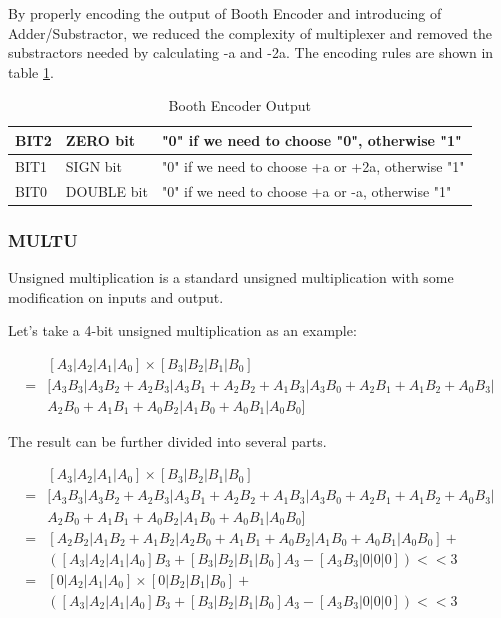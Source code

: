 By properly encoding the output of Booth Encoder and introducing of Adder/Substractor,
we reduced the complexity of multiplexer and removed the substractors needed by calculating -a and -2a.
The encoding rules are shown in table \ref{tab:booth_enc}.

\begin{table}[!ht]
\centering
\caption{Booth Encoder Output}
\label{tab:booth_enc}
\begin{tabular}{|l|l|l|}
\hline
BIT2 & ZERO bit & "0" if we need to choose "0", otherwise "1"\\
\hline
BIT1 & SIGN bit & "0" if we need to choose +a or +2a, otherwise "1"\\
\hline
BIT0 & DOUBLE bit & "0" if we need to choose +a or -a, otherwise "1"\\
\hline
\end{tabular}
\end{table}

\subsubsection[MULTU]{MULTU}
Unsigned multiplication is a standard unsigned multiplication with some modification
on inputs and output.

Let's take a 4-bit unsigned multiplication as an example:

\begin{align*}
&[A_3|A_2|A_1|A_0] \times [B_3|B_2|B_1|B_0]\\
=&[A_3B_3|A_3B_2+A_2B_3|A_3B_1+A_2B_2+A_1B_3|A_3B_0+A_2B_1+A_1B_2+A_0B_3|\\
 &A_2B_0+A_1B_1+A_0B_2|A_1B_0+A_0B_1|A_0B_0]
\end{align*}

The result can be further divided into several parts.

\begin{align*}
&[A_3|A_2|A_1|A_0] \times [B_3|B_2|B_1|B_0]\\
=&[A_3B_3|A_3B_2+A_2B_3|A_3B_1+A_2B_2+A_1B_3|A_3B_0+A_2B_1+A_1B_2+A_0B_3|\\
 &A_2B_0+A_1B_1+A_0B_2|A_1B_0+A_0B_1|A_0B_0]\\
=&[A_2B_2|A_1B_2+A_1B_2|A_2B_0+A_1B_1+A_0B_2|A_1B_0+A_0B_1|A_0B_0]+\\
 &([A_3|A_2|A_1|A_0]B_3+[B_3|B_2|B_1|B_0]A_3-[A_3B_3|0|0|0]) << 3\\
=&[0|A_2|A_1|A_0] \times [0|B_2|B_1|B_0]+\\
 &([A_3|A_2|A_1|A_0]B_3+[B_3|B_2|B_1|B_0]A_3-[A_3B_3|0|0|0]) << 3
\end{align*}

